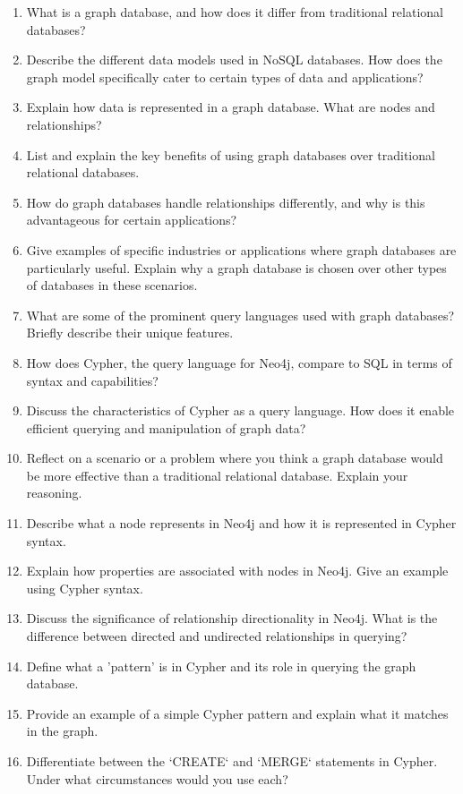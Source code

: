 \begin{enumerate}[nosep]
	\item What is a graph database, and how does it differ from traditional relational databases?
	\item Describe the different data models used in NoSQL databases. How does the graph model specifically cater to certain types of data and applications?
	\item Explain how data is represented in a graph database. What are nodes and relationships?
	\item List and explain the key benefits of using graph databases over traditional relational databases.
	\item How do graph databases handle relationships differently, and why is this advantageous for certain applications?
	\item Give examples of specific industries or applications where graph databases are particularly useful. Explain why a graph database is chosen over other types of databases in these scenarios.
	\item What are some of the prominent query languages used with graph databases? Briefly describe their unique features.
	\item How does Cypher, the query language for Neo4j, compare to SQL in terms of syntax and capabilities?
	\item Discuss the characteristics of Cypher as a query language. How does it enable efficient querying and manipulation of graph data?
	\item Reflect on a scenario or a problem where you think a graph database would be more effective than a traditional relational database. Explain your reasoning.
    \item Describe what a node represents in Neo4j and how it is represented in Cypher syntax.
    \item Explain how properties are associated with nodes in Neo4j. Give an example using Cypher syntax.
	\item Discuss the significance of relationship directionality in Neo4j. What is the difference between directed and undirected relationships in querying?
	\item Define what a 'pattern' is in Cypher and its role in querying the graph database.
	\item Provide an example of a simple Cypher pattern and explain what it matches in the graph.
	\item Differentiate between the `CREATE` and `MERGE` statements in Cypher. Under what circumstances would you use each?

\end{enumerate}
